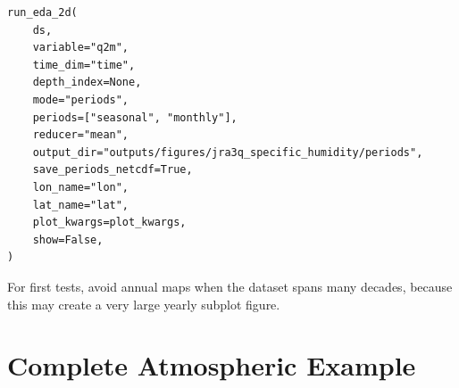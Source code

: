 \documentclass[11pt,a4paper]{article}
\begin{document}
\begin{lstlisting}[style=pythonstyle]
run_eda_2d(
    ds,
    variable="q2m",
    time_dim="time",
    depth_index=None,
    mode="periods",
    periods=["seasonal", "monthly"],
    reducer="mean",
    output_dir="outputs/figures/jra3q_specific_humidity/periods",
    save_periods_netcdf=True,
    lon_name="lon",
    lat_name="lat",
    plot_kwargs=plot_kwargs,
    show=False,
)
\end{lstlisting}

For first tests, avoid annual maps when the dataset spans many decades, because this may create a very large yearly subplot figure.

\section{Complete Atmospheric Example}
\end{document}
